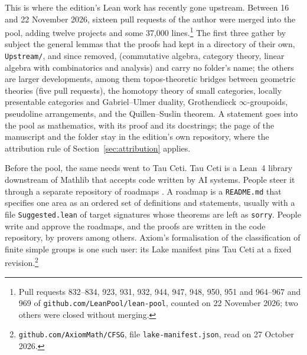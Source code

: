 \documentclass[runningheads,a4paper]{llncs}
\newcommand{\lean}[1]{\texttt{#1}}
\begin{document}
This is where the edition's Lean work has recently gone upstream. Between 16 and 22 November 2026, sixteen pull requests of the author were merged into the pool, adding twelve projects and some 37,000 lines.\footnote{Pull requests 832--834, 923, 931, 932, 944, 947, 948, 950, 951 and 964--967 and 969 of \nolinkurl{github.com/LeanPool/lean-pool}, counted on 22 November 2026; two others were closed without merging.} The first three gather by subject the general lemmas that the proofs had kept in a directory of their own, \texttt{Upstream/}, and since removed, (commutative algebra, category theory, linear algebra with combinatorics and analysis) and carry no folder's name; the others are larger developments, among them topos-theoretic bridges between geometric theories (five pull requests), the homotopy theory of small categories, locally presentable categories and Gabriel--Ulmer duality, Grothendieck $\infty$-groupoids, pseudoline arrangements, and the Quillen--Suslin theorem. A statement goes into the pool as mathematics, with its proof and its docstrings; the page of the manuscript and the folder stay in the edition's own repository, where the attribution rule of Section~\ref{sec:attribution} applies.

Before the pool, the same needs went to Tau Ceti. Tau Ceti \cite{tauceti} is a Lean~4 library downstream of Mathlib that accepts code written by AI systems. People steer it through a separate repository of roadmaps \cite{taucetiroadmap}. A roadmap is a \texttt{README.md} that specifies one area as an ordered set of definitions and statements, usually with a file \texttt{Suggested.lean} of target signatures whose theorems are left as \lean{sorry}. People write and approve the roadmaps, and the proofs are written in the code repository, by provers among others. Axiom's formalisation of the classification of finite simple groups \cite{axiomcfsg} is one such user: its Lake manifest pins Tau Ceti at a fixed revision.\footnote{\nolinkurl{github.com/AxiomMath/CFSG}, file \texttt{lake-manifest.json}, read on 27 October 2026.}
\end{document}
